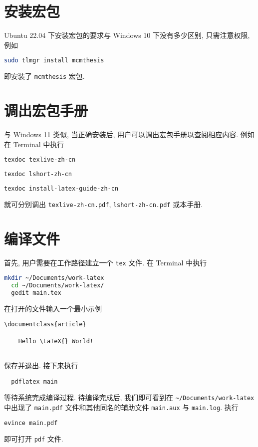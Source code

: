 \section{安装宏包}\label{sec:ubuntu:installpackage}

Ubuntu 22.04 下安装宏包的要求与 Windows 10 下没有多少区别, 只需注意权限, 例如
\begin{lstlisting}[language = bash]
  sudo tlmgr install mcmthesis
\end{lstlisting}
即安装了 \texttt{mcmthesis} 宏包.

\section{调出宏包手册}\label{sec:ubuntu:texdoc}

与 Windows 11 类似,
当正确安装后,
用户可以调出宏包手册以查阅相应内容.
例如在 \textsf{Terminal} 中执行
\begin{lstlisting}[language=bash]
  texdoc texlive-zh-cn
\end{lstlisting}
\begin{lstlisting}[language=bash]
  texdoc lshort-zh-cn
\end{lstlisting}
\begin{lstlisting}[language=bash]
  texdoc install-latex-guide-zh-cn
\end{lstlisting}
就可分别调出 \texttt{texlive-zh-cn.pdf},
\texttt{lshort-zh-cn.pdf}
或本手册.

\section{编译文件}

首先, 用户需要在工作路径建立一个 \texttt{tex} 文件.
在 \textsf{Terminal} 中执行
\begin{lstlisting}[language = bash]
  mkdir ~/Documents/work-latex
  cd ~/Documents/work-latex/
  gedit main.tex
\end{lstlisting}
在打开的文件输入一个最小示例
\begin{lstlisting}[language = {[LaTeX]TeX}]
  \documentclass{article}
  
    Hello \LaTeX{} World!
  
\end{lstlisting}
保存并退出. 
接下来执行
\begin{lstlisting}
  pdflatex main
\end{lstlisting}
等待系统完成编译过程. 
待编译完成后,
我们即可看到在 \texttt{\~{}/Documents/work-latex} 中出现了
\texttt{main.pdf} 文件和其他同名的辅助文件 \texttt{main.aux} 与
\texttt{main.log}. 
执行
\begin{lstlisting}[language=bash]
  evince main.pdf
\end{lstlisting}
即可打开 \texttt{pdf} 文件.

